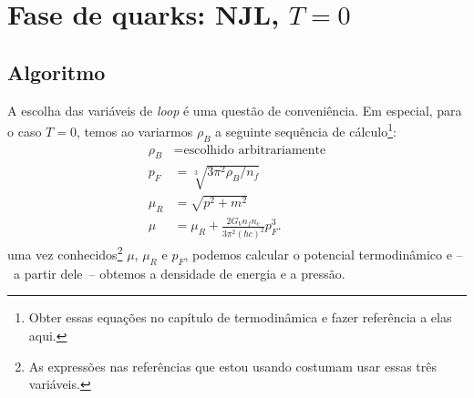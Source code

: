 \section{Fase de quarks: NJL, $T = 0$}

\subsection{Algoritmo}

A escolha das variáveis de \emph{loop} é uma questão de conveniência. Em especial, para o caso $T = 0$, temos ao variarmos $\rho_B$ a seguinte sequência de cálculo\footnote{Obter essas equações no capítulo de termodinâmica e fazer referência a elas aqui.}:
\begin{align}
	\rho_B &= \textrm{escolhido arbitrariamente} \\
	p_F &= \sqrt[3]{3 \pi^2 \rho_B / n_f} \label{Eq:mom_fermi_rho_bar}\\
	\mu_R &= \sqrt{p^2 + m^2} \\
	\mu &= \mu_R + \frac{2 G_V n_f n_c}{3\pi^2(\hbar c)^2} p_F^3.
\end{align}
%
uma vez conhecidos\footnote{As expressões nas referências que estou usando costumam usar essas três variáveis.} $\mu$, $\mu_R$ e $p_F$, podemos calcular o potencial termodinâmico e --~a partir dele~-- obtemos a densidade de energia e a pressão.

